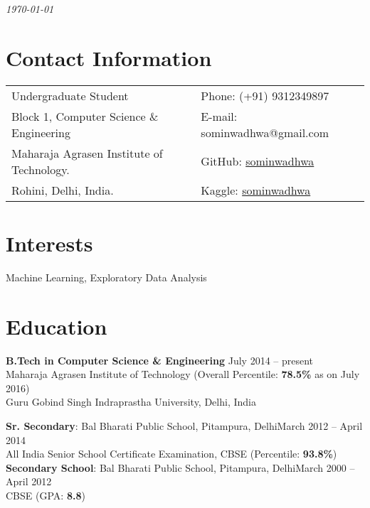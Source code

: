 \documentclass[margin,line]{res}
\begin{document}
 \hfill {\em \today}

\begin{resume}
\section{\sc Contact Information}

\vspace{.025in}
\begin{tabular}{@{}p{3.5in}p{3in}}
Undergraduate Student             & {Phone:}  (+91) 9312349897 \\
Block 1, Computer Science \& Engineering 
 & {E-mail:}  {\color{blue}sominwadhwa@gmail.com} \\
Maharaja Agrasen Institute of Technology. & {GitHub:} {\href{https://github.com/sominwadhwa}{\color{blue}sominwadhwa}}\\
Rohini, Delhi, India.  & {Kaggle:} {\href{https://kaggle.com/sominwadhwa}{\color{blue} sominwadhwa}} \\
\end{tabular}
\section{\sc Interests}
Machine Learning, Exploratory Data Analysis

\section{\sc Education}
{\bf B.Tech in Computer Science \& Engineering} \hfill July 2014 -- present\\
Maharaja Agrasen Institute of Technology \hfill(Overall Percentile: {\bf 78.5\%} as on July 2016)\\
Guru Gobind Singh Indraprastha University, Delhi, India

{\bf Sr. Secondary}: Bal Bharati Public School, Pitampura, Delhi\hfill March 2012 -- April 2014\\
All India Senior School Certificate Examination, CBSE \hfill(Percentile: {\bf 93.8\%})\\
{\bf Secondary School}: Bal Bharati Public School, Pitampura, Delhi\hfill March 2000 -- April 2012\\
CBSE \hfill(GPA: {\bf 8.8})


\end{resume}
\end{document}
